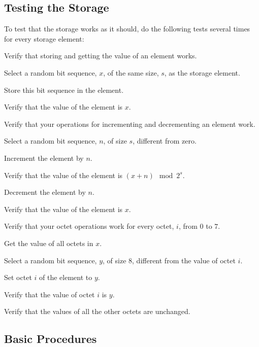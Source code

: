 \documentclass[a4paper,12pt]{article}
\begin{document}
\subsection{Testing the Storage}

To test that the storage works as it should, do the following tests several times for every storage element:
\begin{stepnumbers}
\item Verify that storing and getting the value of an element works.
  \begin{stepletters}
  \item Select a random bit sequence, $x$, of the same size, $s$, as the storage element.
  \item Store this bit sequence in the element.
  \item Verify that the value of the element is $x$.
  \end{stepletters}
\item Verify that your operations for incrementing and decrementing an element work.
  \begin{stepletters}
  \item Select a random bit sequence, $n$, of size $s$, different from zero.
  \item Increment the element by $n$.
  \item Verify that the value of the element is $(x + n) \mod 2^s$.
  \item Decrement the element by $n$.
  \item Verify that the value of the element is $x$.
  \end{stepletters}
\item Verify that your octet operations work for every octet, $i$, from $0$ to $7$.
  \begin{stepletters}
  \item Get the value of all octets in $x$.
  \item Select a random bit sequence, $y$, of size $8$, different from the value of octet $i$.
  \item Set octet $i$ of the element to $y$.
  \item Verify that the value of octet $i$ is $y$.
  \item Verify that the values of all the other octets are unchanged.
  \end{stepletters}
\end{stepnumbers}

\subsection{Basic Procedures}
\end{document}
